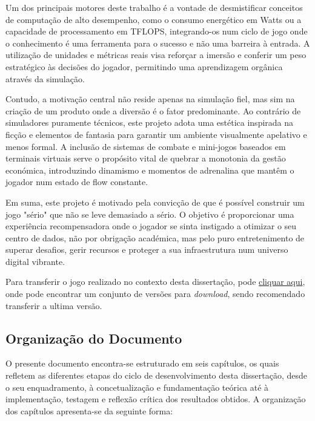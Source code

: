 Um dos principais motores deste trabalho é a vontade de desmistificar 
conceitos de computação de alto desempenho, como o consumo energético em Watts 
ou a capacidade de processamento em TFLOPS, integrando-os num ciclo de jogo 
onde o conhecimento é uma ferramenta para o sucesso e não uma barreira à 
entrada. A utilização de unidades e métricas reais visa reforçar a imersão e 
conferir um peso estratégico às decisões do jogador, permitindo uma aprendizagem 
orgânica através da simulação.

Contudo, a motivação central não reside apenas na simulação fiel, mas sim na 
criação de um produto onde a diversão é o fator predominante. Ao contrário de 
simuladores puramente técnicos, este projeto adota uma estética inspirada na 
ficção e elementos de fantasia para garantir um ambiente visualmente apelativo 
e menos formal. A inclusão de sistemas de combate e mini-jogos baseados em 
terminais virtuais serve o propósito vital de quebrar a monotonia da gestão 
económica, introduzindo dinamismo e momentos de adrenalina que mantêm o jogador 
num estado de flow constante.

Em suma, este projeto é motivado pela convicção de que é possível construir um 
jogo "sério" que não se leve demasiado a sério. O objetivo é proporcionar uma 
experiência recompensadora onde o jogador se sinta instigado a otimizar o seu 
centro de dados, não por obrigação académica, mas pelo puro entretenimento de 
superar desafios, gerir recursos e proteger a sua infraestrutura num universo 
digital vibrante.

Para transferir o jogo realizado no contexto desta dissertação, pode \href{https://github.com/RiseGhost/PORT-0/releases}{cliquar aqui}, onde pode encontrar um conjunto de versões para \textit{download}, sendo recomendado transferir a ultima versão.

\subsection{Organização do Documento}

O presente documento encontra-se estruturado em seis capítulos, os quais refletem as diferentes etapas do ciclo de desenvolvimento desta dissertação, desde o seu enquadramento, à concetualização e fundamentação teórica até à implementação, testagem e reflexão crítica dos resultados obtidos. A organização dos capítulos apresenta-se da seguinte forma:

